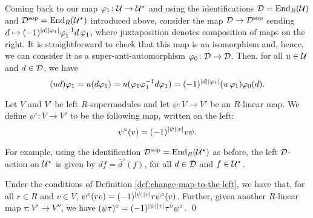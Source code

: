 Coming back to our map $\varphi_1\colon \mathcal U \to \mathcal U^\star$ and using the identifications $\mathcal{D} = \operatorname{End}_R(\mathcal U)$ and $\mathcal{D}^{\mathrm{sop}} = \operatorname{End}_R(\mathcal U^\star)$ introduced above, consider the map $\mathcal{D} \to \mathcal{D}^{\mathrm{sop}}$ sending $d \mapsto (-1)^{|d||\varphi_1|}\varphi_1^{-1} d \,\varphi_1$, where juxtaposition denotes composition of maps on the right. 
It is straightforward to check that this map is an isomorphism and, hence, we can consider it as a super-anti-automorphism $\varphi_0 \colon \mathcal{D} \to \mathcal{D}$. 
Then, for all $u\in \mathcal U$ and $d\in \mathcal{D}$, we have
%
\begin{equation}\label{eq:sesquilinear-before-B}
    (ud)\varphi_1 = u (d\varphi_1) =  u(\varphi_1\varphi_1^{-1} d \varphi_1) = (-1)^{|d||\varphi_1|}(u\,\varphi_1 )\varphi_0(d).
\end{equation}


\begin{defi}\label{def:change-map-to-the-left}
    Let $V$ and $V'$ be left $R$-supermodules and let $\psi: V \to V'$ be an $R$-linear map. We define $\psi^\circ: V \to  V'$ to be the following map, written on the left:
    \[
        \psi^\circ(v) = (-1)^{|\psi||v|} v\psi.
    \]
\end{defi}

For example, using the identification $\mathcal{D}^{\mathrm{sop}} = \operatorname{End}_R (\mathcal U^\star)$ as before, the left $\mathcal{D}$-action on $\mathcal U^\star$ is given by $df = \bar d^\circ (f)$, for all $d\in \mathcal{D}$ and $f\in \mathcal U^\star$.

\begin{lemma}\label{lemma:change-of-side-properties}
    Under the conditions of Definition \ref{def:change-map-to-the-left}, we have that, for all $r\in R$ and $v\in V$,  $\psi^\circ (rv) = (-1)^{|\psi||v|} r \psi^\circ (v)$. 
    Further, given another $R$-linear map $\tau: V' \to V''$, we have $(\psi\tau)^\circ = (-1)^{|\psi||\tau|} \tau^\circ\psi^\circ$. \qed
\end{lemma}



